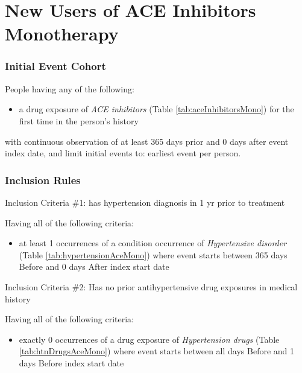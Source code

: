 \documentclass[11pt]{book}
\providecommand{\tightlist}{%
  \setlength{\itemsep}{0pt}\setlength{\parskip}{0pt}}
\theoremstyle{definition}
\theoremstyle{definition}
\theoremstyle{definition}
\theoremstyle{remark}
\begin{document}
\section{New Users of ACE Inhibitors
Monotherapy}\label{AceInhibitorsMono}

\subsubsection*{Initial Event Cohort}\label{initial-event-cohort-1}

People having any of the following:

\begin{itemize}
\tightlist
\item
  a drug exposure of \emph{ACE inhibitors} (Table
  \ref{tab:aceInhibitorsMono}) for the first time in the person's
  history
\end{itemize}

with continuous observation of at least 365 days prior and 0 days after
event index date, and limit initial events to: earliest event per
person.

\subsubsection*{Inclusion Rules}\label{inclusion-rules}

Inclusion Criteria \#1: has hypertension diagnosis in 1 yr prior to
treatment

Having all of the following criteria:

\begin{itemize}
\tightlist
\item
  at least 1 occurrences of a condition occurrence of \emph{Hypertensive
  disorder} (Table \ref{tab:hypertensionAceMono}) where event starts
  between 365 days Before and 0 days After index start date
\end{itemize}

Inclusion Criteria \#2: Has no prior antihypertensive drug exposures in
medical history

Having all of the following criteria:

\begin{itemize}
\tightlist
\item
  exactly 0 occurrences of a drug exposure of \emph{Hypertension drugs}
  (Table \ref{tab:htnDrugsAceMono}) where event starts between all days
  Before and 1 days Before index start date
\end{itemize}
\end{document}
